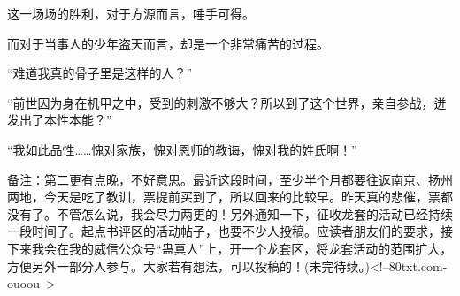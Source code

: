 \begin{this_body}
这一场场的胜利，对于方源而言，唾手可得。

而对于当事人的少年盗天而言，却是一个非常痛苦的过程。

“难道我真的骨子里是这样的人？”

“前世因为身在机甲之中，受到的刺激不够大？所以到了这个世界，亲自参战，迸发出了本性本能？”

“我如此品性……愧对家族，愧对恩师的教诲，愧对我的姓氏啊！”

备注：第二更有点晚，不好意思。最近这段时间，至少半个月都要往返南京、扬州两地，今天是吃了教训，票提前买到了，所以回来的比较早。昨天真的悲催，票都没有了。不管怎么说，我会尽力两更的！另外通知一下，征收龙套的活动已经持续一段时间了。起点书评区的活动帖子，也要不少人投稿。应读者朋友们的要求，接下来我会在我的威信公众号“蛊真人”上，开一个龙套区，将龙套活动的范围扩大，方便另外一部分人参与。大家若有想法，可以投稿的！(未完待续。)<!--80txt.com-ouoou-->

\end{this_body}

